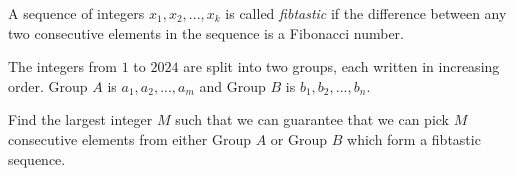 
A sequence of integers $x_{1},x_{2},...,x_{k}$ is called \textit{fibtastic} if the difference between any two consecutive elements in the sequence is a Fibonacci number.

The integers from $1$ to $2024$ are split into two groups, each written in increasing order. Group $A$ is $a_{1},a_{2},...,a_{m}$ and Group $B$ is $b_{1},b_{2},...,b_{n}$.

Find the largest integer $M$ such that we can guarantee that we can pick $M$ consecutive elements from either Group $A$ or Group $B$ which form a fibtastic sequence.

